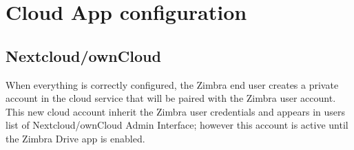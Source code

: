 \section{Cloud App configuration}

\subsection{Nextcloud/ownCloud}\label{subsec:NextcloudownCloudInstallation}
    When everything is correctly configured, the Zimbra end user creates a private account in the cloud service
    that will be paired with the Zimbra user account.
    This new cloud account inherit the Zimbra user credentials and appears in users list of Nextcloud/ownCloud Admin Interface;
    however this account is active until the Zimbra Drive app is enabled.

